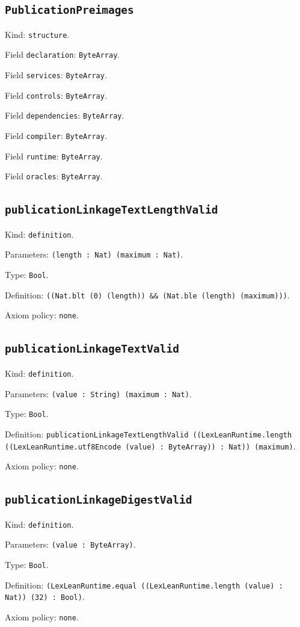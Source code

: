 \documentclass[11pt]{article}
\begin{document}
\subsection*{\texttt{PublicationPreimages}}
\noindent Kind: \texttt{structure}.\par
\noindent Field \texttt{declaration}: \texttt{ByteArray}.\par
\noindent Field \texttt{services}: \texttt{ByteArray}.\par
\noindent Field \texttt{controls}: \texttt{ByteArray}.\par
\noindent Field \texttt{dependencies}: \texttt{ByteArray}.\par
\noindent Field \texttt{compiler}: \texttt{ByteArray}.\par
\noindent Field \texttt{runtime}: \texttt{ByteArray}.\par
\noindent Field \texttt{oracles}: \texttt{ByteArray}.\par
\subsection*{\texttt{publicationLinkageTextLengthValid}}
\noindent Kind: \texttt{definition}.\par
\noindent Parameters: \texttt{(length : Nat) (maximum : Nat)}.\par
\noindent Type: \texttt{Bool}.\par
\noindent Definition: \texttt{((Nat.blt (0) (length)) \&\& (Nat.ble (length) (maximum)))}.\par
\noindent Axiom policy: \texttt{none}.\par
\subsection*{\texttt{publicationLinkageTextValid}}
\noindent Kind: \texttt{definition}.\par
\noindent Parameters: \texttt{(value : String) (maximum : Nat)}.\par
\noindent Type: \texttt{Bool}.\par
\noindent Definition: \texttt{publicationLinkageTextLengthValid ((LexLeanRuntime.length ((LexLeanRuntime.utf8Encode (value) : ByteArray)) : Nat)) (maximum)}.\par
\noindent Axiom policy: \texttt{none}.\par
\subsection*{\texttt{publicationLinkageDigestValid}}
\noindent Kind: \texttt{definition}.\par
\noindent Parameters: \texttt{(value : ByteArray)}.\par
\noindent Type: \texttt{Bool}.\par
\noindent Definition: \texttt{(LexLeanRuntime.equal ((LexLeanRuntime.length (value) : Nat)) (32) : Bool)}.\par
\noindent Axiom policy: \texttt{none}.\par
\end{document}
